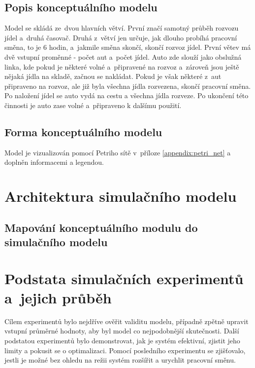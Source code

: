 \documentclass[a4paper, 11pt]{article}
\begin{document}
	\subsection{Popis konceptuálního modelu}

	Model se skládá ze~dvou hlavních větví. První značí samotný průběh
	rozvozu jídel a~druhá časovač. Druhá z~větví jen určuje, jak dlouho
	probíhá pracovní směna, to je 6 hodin, a~jakmile směna skončí, skončí
	rozvoz jídel. První větev má dvě vstupní proměnné - počet aut a~počet
	jídel. Auto zde slouží jako obslužná linka, kde pokud je některé volné
	a~připravené na rozvoz a~zároveň jsou ještě nějaká jídla na skladě,
	začnou se nakládat. Pokud je však některé z~aut připraveno na rozvoz,
	ale již byla všechna jídla rozvezena, skončí pracovní směna. Po
	naložení jídel se auto vydá na cestu a všechna jídla rozveze. Po ukončení
	této činnosti je auto zase volné a~připraveno k dalšímu použití.


	\subsection{Forma konceptuálního modelu}

	Model je vizualizován pomocí Petriho sítě v~příloze
	\ref{appendix:petri_net} a doplněn informacemi a legendou.



	\section{Architektura simulačního modelu}


	\subsection{Mapování konceptuálního modulu do simulačního modelu}



	\section{Podstata simulačních experimentů a~jejich průběh}

	Cílem experimentů bylo nejdříve ověřit validitu modelu, případně zpětně 
	upravit vstupní průměrné hodnoty, aby byl model co nejpodobnější skutečnosti.
	Další podstatou experimentů bylo demonstrovat, jak je systém efektivní, 
	zjistit jeho limity a pokusit se o optimalizaci. Pomocí posledního 
	experimentu se zjišťovalo, jestli je možné bez ohledu na režii systém 
	rozšířit a urychlit pracovní směnu.
\end{document}
